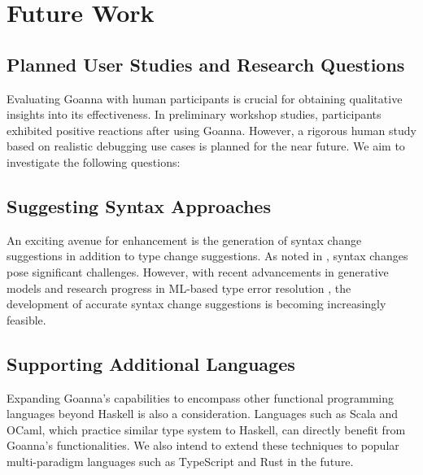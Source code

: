 \documentclass[pdflatex,sn-mathphys-num]{sn-jnl}%
\begin{document}
\section{Future Work}\label{sec:future-work}

\subsection{Planned User Studies and Research Questions}

Evaluating Goanna with human participants is crucial for obtaining qualitative insights into its effectiveness. In preliminary workshop studies, participants exhibited positive reactions after using Goanna. However, a rigorous human study based on realistic debugging use cases is planned for the near future. We aim to investigate the following questions:


\subsection{Suggesting Syntax Approaches}

An exciting avenue for enhancement is the generation of syntax change suggestions in addition to type change suggestions. As noted in \cite{Chen2014-dz}, syntax changes pose significant challenges. However, with recent advancements in generative models and research progress in ML-based type error resolution \cite{Seidel2017-uf}, the development of accurate syntax change suggestions is becoming increasingly feasible.

\subsection{Supporting Additional Languages}

Expanding Goanna's capabilities to encompass other functional programming languages beyond Haskell is also a consideration. Languages such as Scala and OCaml, which practice similar type system to Haskell, can directly benefit from Goanna's functionalities. We also intend to extend these techniques to popular multi-paradigm languages such as TypeScript and Rust in the future.
\end{document}
